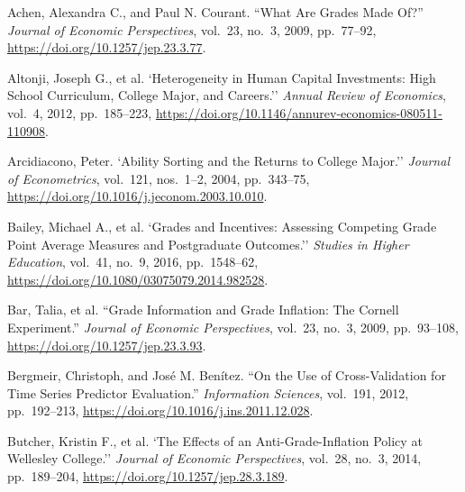\label{sec:works-cited}
\begin{list}{}{\setlength{\leftmargin}{1.5em}\setlength{\itemindent}{-1.5em}\setlength{\itemsep}{0.25em}\setlength{\parsep}{0pt}}
\small
\item Achen, Alexandra C., and Paul N. Courant. ``What Are Grades Made Of?'' \textit{Journal of Economic Perspectives}, vol.~23, no.~3, 2009, pp.~77--92, \url{https://doi.org/10.1257/jep.23.3.77}.
\item Altonji, Joseph G., et al. `Heterogeneity in Human Capital Investments: High School Curriculum, College Major, and Careers.'' \textit{Annual Review of Economics}, vol.~4, 2012, pp.~185--223, \url{https://doi.org/10.1146/annurev-economics-080511-110908}.
\item Arcidiacono, Peter. `Ability Sorting and the Returns to College Major.'' \textit{Journal of Econometrics}, vol.~121, nos.~1--2, 2004, pp.~343--75, \url{https://doi.org/10.1016/j.jeconom.2003.10.010}.
\item Bailey, Michael A., et al. `Grades and Incentives: Assessing Competing Grade Point Average Measures and Postgraduate Outcomes.'' \textit{Studies in Higher Education}, vol.~41, no.~9, 2016, pp.~1548--62, \url{https://doi.org/10.1080/03075079.2014.982528}.
\item Bar, Talia, et al. ``Grade Information and Grade Inflation: The Cornell Experiment.'' \textit{Journal of Economic Perspectives}, vol.~23, no.~3, 2009, pp.~93--108, \url{https://doi.org/10.1257/jep.23.3.93}.
\item Bergmeir, Christoph, and Jos\'e M. Ben\'itez. ``On the Use of Cross-Validation for Time Series Predictor Evaluation.'' \textit{Information Sciences}, vol.~191, 2012, pp.~192--213, \url{https://doi.org/10.1016/j.ins.2011.12.028}.
\item Butcher, Kristin F., et al. `The Effects of an Anti-Grade-Inflation Policy at Wellesley College.'' \textit{Journal of Economic Perspectives}, vol.~28, no.~3, 2014, pp.~189--204, \url{https://doi.org/10.1257/jep.28.3.189}.

\end{list}
